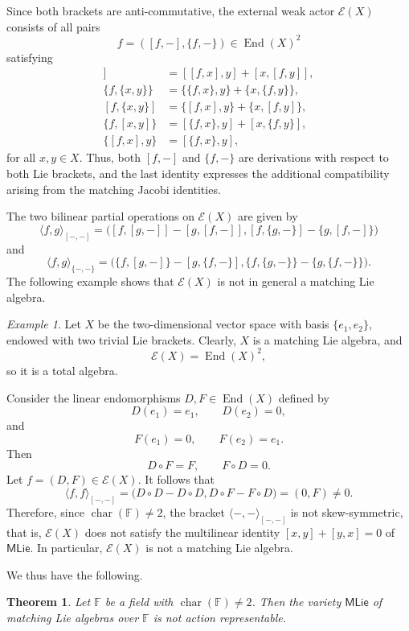 \documentclass[reqno,a4paper]{amsart}
\theoremstyle{plain}
\newtheorem{theorem}[subsection]{Theorem}
\theoremstyle{definition}
\theoremstyle{remark}
\newtheorem{example}[subsection]{Example}
\numberwithin{equation}{section}
\newcommand{\F}{\mathbb{F}}
\newcommand{\E}{\mathcal{E}}
\DeclareMathOperator{\bchar}{char}
\DeclareMathOperator{\End}{End}
\newcommand{\MatchLie}{\ensuremath{\mathsf{MLie}}}
\begin{document}
Since both brackets are anti-commutative, the external weak actor $\E(X)$ consists of all pairs
\[
f=([f,-],\{f,-\})\in\End(X)^2
\]
satisfying
\begin{align*}
[f,[x,y]]
&=[[f,x],y]+[x,[f,y]],\\
\{f,\{x,y\}\}
&=\{\{f,x\},y\}+\{x,\{f,y\}\},\\
[f,\{x,y\}]
&=\{[f,x],y\}+\{x,[f,y]\},\\
\{f,[x,y]\}
&=[\{f,x\},y]+[x,\{f,y\}],\\
\{[f,x],y\}
&=[\{f,x\},y],
\end{align*}
for all $x,y\in X$. Thus, both $[f,-]$ and $\{f,-\}$ are derivations with respect to both Lie brackets, and the last identity expresses the additional compatibility arising from the matching Jacobi identities.

The two bilinear partial operations on $\E(X)$ are given by
\[
\langle f,g\rangle_{[-,-]}
=
\bigl(
[f,[g,-]]-[g,[f,-]],
[f,\{g,-\}]-\{g,[f,-]\}
\bigr)
\]
and
\[
\langle f,g\rangle_{\{-,-\}}
=
\bigl(
\{f,[g,-]\}-[g,\{f,-\}],
\{f,\{g,-\}\}-\{g,\{f,-\}\}
\bigr).
\]
The following example shows that $\E(X)$ is not in general a matching Lie algebra.

\begin{example}\label{ExampleExternalMatchingLie}
Let $X$ be the two-dimensional vector space with basis $\{e_1,e_2\}$, endowed with two trivial Lie brackets. Clearly, $X$ is a matching Lie algebra, and
\[
\E(X)=\End(X)^2,
\]
so it is a total algebra.

Consider the linear endomorphisms $D,F\in\End(X)$ defined by
\[
D(e_1)=e_1,
\qquad
D(e_2)=0,
\]
and
\[
F(e_1)=0,
\qquad
F(e_2)=e_1.
\]
Then
\[
D\circ F=F,
\qquad
F\circ D=0.
\]
Let $f=(D,F)\in\E(X)$. It follows that
\[
\langle f,f\rangle_{[-,-]}
=
\bigl(
D\circ D-D\circ D,
D\circ F-F\circ D
\bigr)
=
(0,F)\neq0.
\]
Therefore, since $\bchar(\F)\neq2$, the bracket $\langle-,-\rangle_{[-,-]}$ is not skew-symmetric, that is, $\E(X)$ does not satisfy the multilinear identity $[x,y]+[y,x]=0$ of $\MatchLie$. In particular, $\E(X)$ is not a matching Lie algebra.
\end{example}

We thus have the following.

\begin{theorem}\label{TheoremMatchingLieNotAR}
Let $\F$ be a field with $\bchar(\F)\neq2$. Then the variety $\MatchLie$ of matching Lie algebras over $\F$ is not action representable.
\end{theorem}
\end{document}

